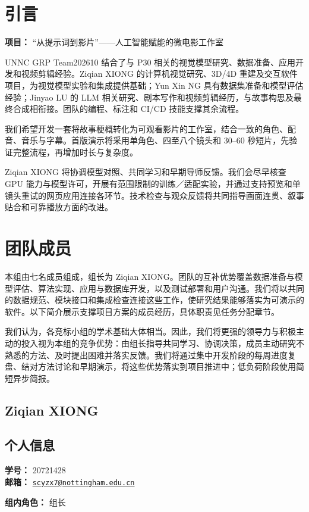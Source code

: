 \documentclass[a4paper,12pt]{article}
\title{\BidTitle}
\author{\BidTeam}
\date{\BidDate}
\newcommand{\PersonalInformation}[2]{%
  \subsection*{个人信息}
  \if\relax\detokenize{#1}\relax\else
  \noindent\textbf{学号：} #1\\
  \fi
  \textbf{邮箱：} #2\par
}
\newcommand{\BidProjectName}{“从提示词到影片”——人工智能赋能的微电影工作室}
\begin{document}
\maketitle
\thispagestyle{plain}
\tableofcontents
\newpage

\section{引言}
\noindent\textbf{项目：} \BidProjectName
\par\medskip
UNNC GRP Team202610 结合了与 P30 相关的视觉模型研究、数据准备、应用开发和视频剪辑经验。Ziqian XIONG 的计算机视觉研究、3D/4D 重建及交互软件项目，为视觉模型实验和集成提供基础；Yun Xin NG 具有数据集准备和模型评估经验；Jinyao LU 的 LLM 相关研究、剧本写作和视频剪辑经历，与故事构思及最终合成相衔接。团队的编程、标注和 CI/CD 技能支撑其余流程。

我们希望开发一套将故事梗概转化为可观看影片的工作室，结合一致的角色、配音、音乐与字幕。首版演示将采用单角色、四至八个镜头和 30--60 秒短片，先验证完整流程，再增加时长与复杂度。

Ziqian XIONG 将协调模型对照、共同学习和早期导师反馈。我们会尽早核查 GPU 能力与模型许可，开展有范围限制的训练／适配实验，并通过支持预览和单镜头重试的网页应用连接各环节。技术检查与观众反馈将共同指导画面连贯、叙事贴合和可靠播放方面的改进。

\newpage
\section{团队成员}
本组由七名成员组成，组长为 Ziqian XIONG。团队的互补优势覆盖数据准备与模型评估、算法实现、应用与数据库开发，以及测试部署和用户沟通。我们将以共同的数据规范、模块接口和集成检查连接这些工作，使研究结果能够落实为可演示的软件。以下简介展示支撑项目方案的成员经历，具体职责见任务分配章节。

我们认为，各竞标小组的学术基础大体相当。因此，我们将更强的领导力与积极主动的投入视为本组的竞争优势：由组长指导共同学习、协调决策，成员主动研究不熟悉的方法、及时提出困难并落实反馈。我们将通过集中开发阶段的每周进度复盘、结对方法讨论和早期演示，将这些优势落实到项目推进中；低负荷阶段使用简短异步简报。

\subsection{Ziqian XIONG}
\PersonalInformation{20721428}{\href{mailto:scyzx7@nottingham.edu.cn}{\nolinkurl{scyzx7@nottingham.edu.cn}}}
\noindent\textbf{组内角色：} 组长\par
\end{document}
